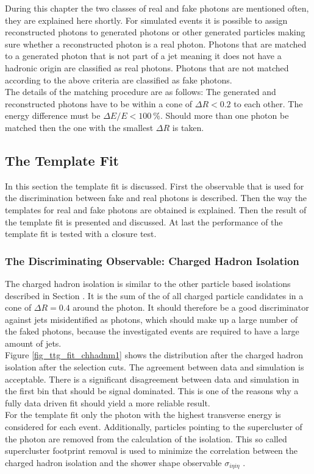 During this chapter the two classes of real and fake photons are mentioned often, they are explained here shortly. For simulated events it is possible to assign reconstructed photons to generated photons or other generated particles making sure whether a reconstructed photon is a real photon. Photons that are matched to a generated photon that is not part of a jet meaning it does not have a hadronic origin are classified as real photons. Photons that are not matched according to the above criteria are classified as fake photons.\\
The details of the matching procedure are as follows: The generated and reconstructed photons have to be within a cone of $\Delta R < 0.2$ to each other. The energy difference must be $\Delta E / E < \SI{100}{\percent}$. Should more than one photon be matched then the one with the smallest $\Delta R$ is taken.  

\subsection{The Template Fit}

In this section the template fit is discussed. First the observable that is used for the discrimination between fake and real photons is described. Then the way the templates for real and fake photons are obtained is explained. Then the result of the template fit is presented and discussed. At last the performance of the template fit is tested with a closure test. \\

\subsubsection{The Discriminating Observable: Charged Hadron Isolation}

The charged hadron isolation is similar to the other particle based isolations described in Section . It is the sum of the \pt of all charged particle candidates in a cone of $\Delta R = 0.4$ around the photon. It should therefore be a good discriminator against jets misidentified as photons, which should make up a large number of the faked photons, because the investigated \ttgamma events are required to have a large amount of jets.\\  
Figure \ref{fig_ttg_fit_chhadnm1} shows the distribution after the charged hadron isolation after the selection cuts. The agreement between data and simulation is acceptable. There is a significant disagreement between data and simulation in the first bin that should be signal dominated. This is one of the reasons why a fully data driven fit should yield a more reliable result.\\
For the template fit only the photon with the highest transverse energy is considered for each event. Additionally, particles pointing to the supercluster of the photon are removed from the calculation of the isolation. This so called supercluster footprint removal is used to minimize the correlation between the charged hadron isolation and the shower shape observable $\sigma_{i \eta i \eta}$ \cite{CMS-PAS-HIG-13-006}.\\

